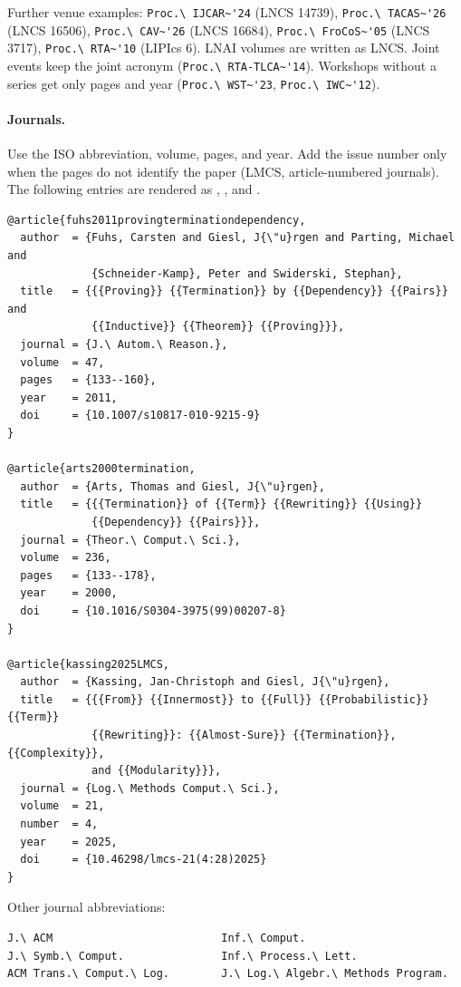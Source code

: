 Further venue examples: \lstinline|Proc.\ IJCAR~'24| (LNCS 14739),
\lstinline|Proc.\ TACAS~'26| (LNCS 16506), \lstinline|Proc.\ CAV~'26|
(LNCS 16684), \lstinline|Proc.\ FroCoS~'05| (LNCS 3717),
\lstinline|Proc.\ RTA~'10| (LIPIcs 6).
LNAI volumes are written as LNCS.
Joint events keep the joint acronym (\lstinline|Proc.\ RTA-TLCA~'14|).
Workshops without a series get only pages and year (\lstinline|Proc.\ WST~'23|,
\lstinline|Proc.\ IWC~'12|).

\paragraph{Journals.}
Use the ISO abbreviation, volume, pages, and year.
Add the issue number only when the pages do not identify the paper (LMCS,
article-numbered journals).
The following entries are rendered as \cite{fuhs2011provingterminationdependency},
\cite{arts2000termination}, and \cite{kassing2025LMCS}.

\begin{lstlisting}
@article{fuhs2011provingterminationdependency,
  author  = {Fuhs, Carsten and Giesl, J{\"u}rgen and Parting, Michael and
             {Schneider-Kamp}, Peter and Swiderski, Stephan},
  title   = {{{Proving}} {{Termination}} by {{Dependency}} {{Pairs}} and
             {{Inductive}} {{Theorem}} {{Proving}}},
  journal = {J.\ Autom.\ Reason.},
  volume  = 47,
  pages   = {133--160},
  year    = 2011,
  doi     = {10.1007/s10817-010-9215-9}
}

@article{arts2000termination,
  author  = {Arts, Thomas and Giesl, J{\"u}rgen},
  title   = {{{Termination}} of {{Term}} {{Rewriting}} {{Using}}
             {{Dependency}} {{Pairs}}},
  journal = {Theor.\ Comput.\ Sci.},
  volume  = 236,
  pages   = {133--178},
  year    = 2000,
  doi     = {10.1016/S0304-3975(99)00207-8}
}

@article{kassing2025LMCS,
  author  = {Kassing, Jan-Christoph and Giesl, J{\"u}rgen},
  title   = {{{From}} {{Innermost}} to {{Full}} {{Probabilistic}} {{Term}}
             {{Rewriting}}: {{Almost-Sure}} {{Termination}}, {{Complexity}},
             and {{Modularity}}},
  journal = {Log.\ Methods Comput.\ Sci.},
  volume  = 21,
  number  = 4,
  year    = 2025,
  doi     = {10.46298/lmcs-21(4:28)2025}
}
\end{lstlisting}

Other journal abbreviations:
\begin{lstlisting}
J.\ ACM                          Inf.\ Comput.
J.\ Symb.\ Comput.               Inf.\ Process.\ Lett.
ACM Trans.\ Comput.\ Log.        J.\ Log.\ Algebr.\ Methods Program.
\end{lstlisting}

